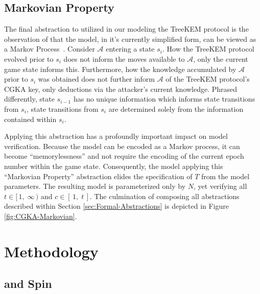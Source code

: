 \documentclass[runningheads]{llncs}
\newcommand{\Adversary}{\ensuremath{\mathcal{A}}\xspace}
\newcommand{\NumericRange}[2]{\ensuremath{\left[\,#1,\; #2\,\right]}\xspace}
\newcommand{\NumericRangeOpenR}[2]{\ensuremath{[\,#1,\; #2\,)}\xspace}
\begin{document}
\subsection{Markovian Property}

The final abstraction to utilized in our modeling the TreeKEM protocol is the observation of that the model, in it's currently simplified form, can be viewed as a Markov Process~\cite{markov1906a}.
Consider \Adversary entering a \CGKAsec state $s_{i}$.
How the TreeKEM protocol evolved prior to $s_{i}$ does not inform the moves available to \Adversary, only the current game state informs this.
Furthermore, how the knowledge accumulated by \Adversary prior to $s_{i}$ was obtained does not further inform \Adversary of the TreeKEM protocol's CGKA key, only deductions via the attacker's current knowledge.
Phrased differently, state $s_{i-1}$ has no unique information which informs state transitions from $s_{i}$, state transitions from $s_{i}$ are determined solely from the information contained within $s_{i}$.

Applying this abstraction has a profoundly important impact on model verification.
Because the model can be encoded as a Markov process, it can become ``memorylessness'' and not require the encoding of the current epoch number within the game state.
Consequently, the model applying this ``Markovian Property'' abstraction elides the specification of $T$ from the model parameters.
The resulting model is parameterized only by $N$, yet verifying all $t \in \NumericRangeOpenR{1}{\infty}$ and $c \in \NumericRange{1}{t}$.
The culmination of composing all abstractions described within Section \ref{sec:Formal-Abstractions} is depicted in Figure \ref{fig:CGKA-Markovian}.



\section{Methodology}

\subsection{\Promela and Spin}
\end{document}
